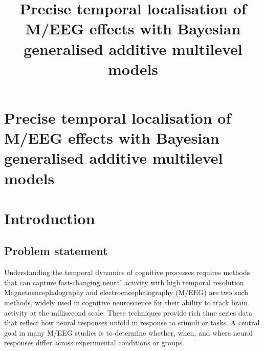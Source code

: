 \documentclass[
  doc,
  floatsintext,
  longtable,
  a4paper,
  nolmodern,
  notxfonts,
  notimes,
  donotrepeattitle,
  colorlinks=true,linkcolor=blue,citecolor=blue,urlcolor=blue]{apa7}
\title{Precise temporal localisation of M/EEG effects with Bayesian
generalised additive multilevel models}
\begin{document}
\maketitle

\hypertarget{toc}{}
\tableofcontents
\newpage
\section[Introduction]{Precise temporal localisation of M/EEG effects
with Bayesian generalised additive multilevel models}

\setcounter{secnumdepth}{-\maxdimen} %

\setlength\LTleft{0pt}

\resetlinenumber[1]

\section{Introduction}\label{introduction}

\subsection{Problem statement}\label{problem-statement}

Understanding the temporal dynamics of cognitive processes requires
methods that can capture fast-changing neural activity with high
temporal resolution. Magnetoencephalography and electroencephalography
(M/EEG) are two such methods, widely used in cognitive neuroscience for
their ability to track brain activity at the millisecond scale. These
techniques provide rich time series data that reflect how neural
responses unfold in response to stimuli or tasks. A central goal in many
M/EEG studies is to determine whether, when, and where neural responses
differ across experimental conditions or groups.
\end{document}
